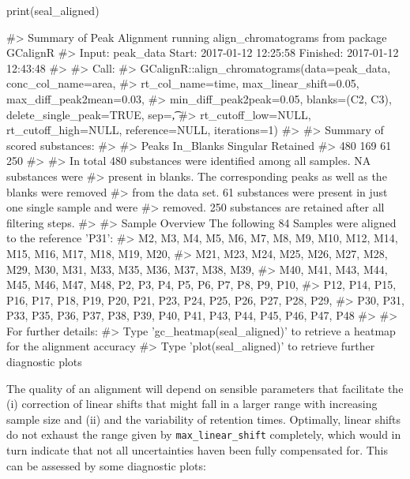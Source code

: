 \begin{Schunk}
\begin{Sinput}
print(seal_aligned)
\end{Sinput}
\begin{Soutput}
#>   Summary of Peak Alignment running align_chromatograms from package GCalignR
#>   Input: peak_data   Start:  2017-01-12 12:25:58     Finished:  2017-01-12 12:43:48 
#> 
#> Call:
#>   GCalignR::align_chromatograms(data=peak_data, conc_col_name=area,
#>   rt_col_name=time, max_linear_shift=0.05, max_diff_peak2mean=0.03,
#>   min_diff_peak2peak=0.05, blanks=(C2, C3), delete_single_peak=TRUE, sep=\t,
#>   rt_cutoff_low=NULL, rt_cutoff_high=NULL, reference=NULL, iterations=1)
#> 
#> Summary of scored substances:
#> 
#>     Peaks In_Blanks  Singular  Retained 
#>       480       169        61       250 
#> 
#>   In total 480 substances were identified among all samples. NA substances were
#>   present in blanks. The corresponding peaks as well as the blanks were removed
#>   from the data set. 61 substances were present in just one single sample and were
#>   removed. 250 substances are retained after all filtering steps.
#> 
#> Sample Overview  The following 84 Samples were aligned to the reference 'P31':
#>   M2, M3, M4, M5, M6, M7, M8, M9, M10, M12, M14, M15, M16, M17, M18, M19, M20,
#>   M21, M23, M24, M25, M26, M27, M28, M29, M30, M31, M33, M35, M36, M37, M38, M39,
#>   M40, M41, M43, M44, M45, M46, M47, M48, P2, P3, P4, P5, P6, P7, P8, P9, P10,
#>   P12, P14, P15, P16, P17, P18, P19, P20, P21, P23, P24, P25, P26, P27, P28, P29,
#>   P30, P31, P33, P35, P36, P37, P38, P39, P40, P41, P43, P44, P45, P46, P47, P48
#> 
#> For further details:
#>   Type 'gc_heatmap(seal_aligned)' to retrieve a heatmap for the alignment accuracy
#>   Type 'plot(seal_aligned)' to retrieve further diagnostic plots
\end{Soutput}
\end{Schunk}

The quality of an alignment will depend on sensible parameters that
facilitate the (i) correction of linear shifts that might fall in a
larger range with increasing sample size and (ii) and the variability of
retention times. Optimally, linear shifts do not exhaust the range given
by \texttt{max\_linear\_shift} completely, which would in turn indicate
that not all uncertainties haven been fully compensated for. This can be
assessed by some diagnostic plots:

